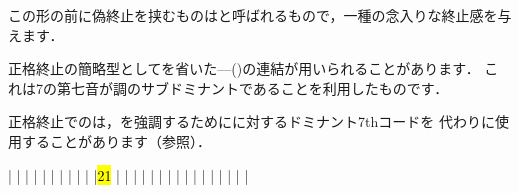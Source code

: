 \documentclass[dvipdfmx,uplatex,b5paper,openany,jbase=12Q,nomag*,textwidth-limit=44%
               ]{gachimuchi}
\begin{document}
この形の前に偽終止を挟むものはと呼ばれるもので，一種の念入りな終止感を与えます．

正格終止の簡略型としてを省いた\Gnv{}---\Gni(\Min)の連結が用いられることがあります．
これは\Gnv\subsc7の第七音が調のサブドミナントであることを利用したものです．

正格終止でのは，を強調するためにに対するドミナント7thコードを
代わりに使用することがあります（参照）．

\begin{Music}
  \generalmeter{\meterC}%
  \relax
  \Startpiece%
  \NOTEs{}%
  |%
  \en\bar
  \NOTEs%
  |%
  \en\bar
  \NOTEs%
  |%
  \en\doublebar%
  \NOTEs%
  |%
  \en\bar
  \NOTEs%
  |%
  \en\bar
  \NOTEs%
  |%
  \en\doublebar%
  \NOTes%
  \sk
  |\hl{2}\hl{1}%
  \en\bar
  \NOTEs%
  |%
  \en\doublebar%
  \NOTEs%
  |%
  \en\bar
  \NOTEs%
  |%
  \en\bar
  \NOTEs%
  |%
  \en\setdoublebar%
  \endpiece%
  \generalmeter{\meterC}%
  \relax
  \Startpiece%
  \NOTEs{}%
  |%
  \en\bar
  \NOTEs%
  |%
  \en\bar\hardspace{\nawidth}%
  \NOTEs%
  |%
  \en\doublebar%
  \NOTEs%
  |%
  \en\bar
  \NOTEs%
  |%
  \en\bar\hardspace{\nawidth}%

\end{Music}
\end{document}
